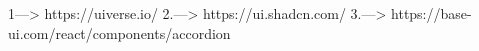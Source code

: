 1---> https://uiverse.io/
2.---> https://ui.shadcn.com/
3.---> https://base-ui.com/react/components/accordion

